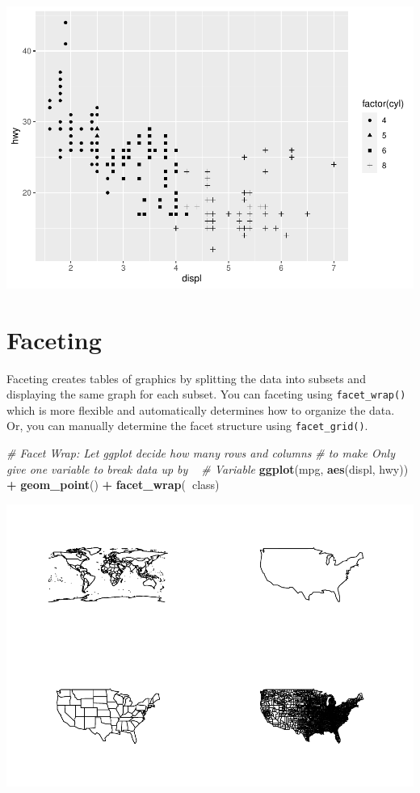 \documentclass[
]{book}
\newenvironment{Shaded}{\begin{snugshade}}{\end{snugshade}}
\newcommand{\CommentTok}[1]{\textcolor[rgb]{0.56,0.35,0.01}{\textit{#1}}}
\newcommand{\KeywordTok}[1]{\textcolor[rgb]{0.13,0.29,0.53}{\textbf{#1}}}
\newcommand{\NormalTok}[1]{#1}
\newcommand{\OperatorTok}[1]{\textcolor[rgb]{0.81,0.36,0.00}{\textbf{#1}}}
\newcommand{\StringTok}[1]{\textcolor[rgb]{0.31,0.60,0.02}{#1}}
\begin{document}
\includegraphics{_main_files/figure-latex/unnamed-chunk-255-3.pdf}

\hypertarget{faceting}{%
\section{Faceting}\label{faceting}}

Faceting creates tables of graphics by splitting the data into subsets and displaying the same graph for each subset. You can faceting using \texttt{facet\_wrap()} which is more flexible and automatically determines how to organize the data. Or, you can manually determine the facet structure using \texttt{facet\_grid()}.

\begin{Shaded}
\begin{Highlighting}[]
\CommentTok{# Facet Wrap: Let ggplot decide how many rows and columns}
\CommentTok{# to make Only give one variable to break data up by ~}
\CommentTok{# Variable}
\KeywordTok{ggplot}\NormalTok{(mpg, }\KeywordTok{aes}\NormalTok{(displ, hwy)) }\OperatorTok{+}\StringTok{ }\KeywordTok{geom_point}\NormalTok{() }\OperatorTok{+}\StringTok{ }\KeywordTok{facet_wrap}\NormalTok{(}\OperatorTok{~}\NormalTok{class)}
\end{Highlighting}
\end{Shaded}

\includegraphics{_main_files/figure-latex/unnamed-chunk-256-1.pdf}
\end{document}
